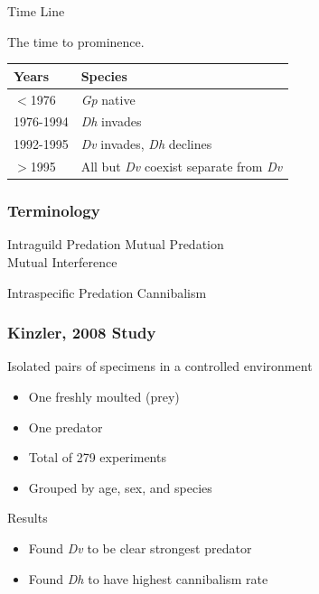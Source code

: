 \begin{frame}{Time Line}

  \vfill

  The time to prominence. 

  \vfill

  \begin{tabular}{l|l}
    Years      & Species \\ \hline
    $<$1976    & \textit{Gp} native\\
    1976-1994  & \textit{Dh} invades\\
    1992-1995  & \textit{Dv} invades, \textit{Dh} declines\\
    $>$1995    & All but \textit{Dv} coexist separate from \textit{Dv}
  \end{tabular}

  \vfill

\end{frame}

\begin{frame}
   \frametitle{Terminology}
	\begin{block}{Intraguild Predation}
		Mutual Predation\\
		Mutual Interference \\
	\end{block}
	\begin{block}{Intraspecific Predation}
		Cannibalism
	\end{block}
    \cite{doi:10.1146/annurev.es.20.110189.001501}
\end{frame}

\begin{frame}
   \frametitle{Kinzler, 2008 Study}
	\vfill
	
	Isolated pairs of specimens in a controlled environment
	\begin{itemize}
		\item One freshly moulted (prey) 
		\item One predator
		\item Total of 279 experiments
		\item Grouped by age, sex, and species
	\end{itemize}
	
\vfill
	Results\\
	\begin{itemize}
	\item Found \textit{Dv} to be clear strongest predator\\
\vspace{.5em}
	\item Found \textit{Dh} to have highest cannibalism rate
\end{itemize}

\vfill
\end{frame}

